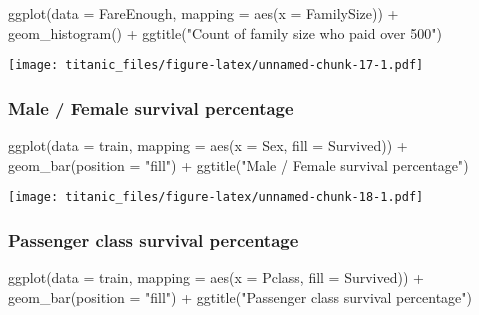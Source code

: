 \documentclass[
]{article}
\newenvironment{Shaded}{\begin{snugshade}}{\end{snugshade}}
\newcommand{\AttributeTok}[1]{\textcolor[rgb]{0.77,0.63,0.00}{#1}}
\newcommand{\FunctionTok}[1]{\textcolor[rgb]{0.00,0.00,0.00}{#1}}
\newcommand{\NormalTok}[1]{#1}
\newcommand{\SpecialCharTok}[1]{\textcolor[rgb]{0.00,0.00,0.00}{#1}}
\newcommand{\StringTok}[1]{\textcolor[rgb]{0.31,0.60,0.02}{#1}}
\begin{document}
\begin{Shaded}
\begin{Highlighting}[]
\FunctionTok{ggplot}\NormalTok{(}\AttributeTok{data =}\NormalTok{ FareEnough, }\AttributeTok{mapping =} \FunctionTok{aes}\NormalTok{(}\AttributeTok{x =}\NormalTok{ FamilySize)) }\SpecialCharTok{+}
  \FunctionTok{geom\_histogram}\NormalTok{() }\SpecialCharTok{+}
  \FunctionTok{ggtitle}\NormalTok{(}\StringTok{"Count of family size who paid over 500"}\NormalTok{)}
\end{Highlighting}
\end{Shaded}

\texttt{[image: titanic\_files/figure-latex/unnamed-chunk-17-1.pdf]}

\hypertarget{male-female-survival-percentage}{%
\subsubsection{Male / Female survival
percentage}\label{male-female-survival-percentage}}

\begin{Shaded}
\begin{Highlighting}[]
\FunctionTok{ggplot}\NormalTok{(}\AttributeTok{data =}\NormalTok{ train, }\AttributeTok{mapping =} \FunctionTok{aes}\NormalTok{(}\AttributeTok{x =}\NormalTok{ Sex, }\AttributeTok{fill =}\NormalTok{ Survived)) }\SpecialCharTok{+}
  \FunctionTok{geom\_bar}\NormalTok{(}\AttributeTok{position =} \StringTok{"fill"}\NormalTok{) }\SpecialCharTok{+}
  \FunctionTok{ggtitle}\NormalTok{(}\StringTok{"Male / Female survival percentage"}\NormalTok{)}
\end{Highlighting}
\end{Shaded}

\texttt{[image: titanic\_files/figure-latex/unnamed-chunk-18-1.pdf]}

\hypertarget{passenger-class-survival-percentage}{%
\subsubsection{Passenger class survival
percentage}\label{passenger-class-survival-percentage}}

\begin{Shaded}
\begin{Highlighting}[]
\FunctionTok{ggplot}\NormalTok{(}\AttributeTok{data =}\NormalTok{ train, }\AttributeTok{mapping =} \FunctionTok{aes}\NormalTok{(}\AttributeTok{x =}\NormalTok{ Pclass, }\AttributeTok{fill =}\NormalTok{ Survived)) }\SpecialCharTok{+}
  \FunctionTok{geom\_bar}\NormalTok{(}\AttributeTok{position =} \StringTok{"fill"}\NormalTok{) }\SpecialCharTok{+}
  \FunctionTok{ggtitle}\NormalTok{(}\StringTok{"Passenger class survival percentage"}\NormalTok{)}
\end{Highlighting}
\end{Shaded}
\end{document}
